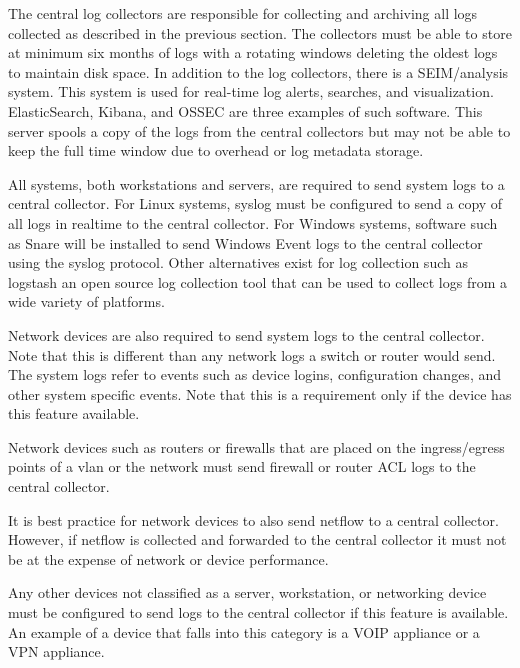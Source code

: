 The central log collectors are responsible for collecting and archiving all logs 
collected as described in the previous section. The collectors must be able to 
store at minimum six months of logs with a rotating windows deleting the oldest 
logs to maintain disk space. In addition to the log collectors, there is a SEIM/analysis 
system. This system is used for real-time log alerts, searches, and 
visualization. ElasticSearch, Kibana, and OSSEC are three examples of such 
software. This server spools a copy of the logs from the central collectors but 
may not be able to keep the full time window due to overhead or log metadata 
storage.

All systems, both workstations and servers, are required to send system logs to 
a central collector. For Linux systems, syslog must be configured to send a copy 
of all logs in realtime to the central collector. For Windows systems, software 
such as Snare will be installed to send Windows Event logs to the central 
collector using the syslog protocol. Other alternatives exist for log collection 
such as logstash an open source log collection tool that can be used to collect 
logs from a wide variety of platforms.

Network devices are also required to send system logs to the central collector. 
Note that this is different than any network logs a switch or router would send. 
The system logs refer to events such as device logins, configuration changes, and 
other system specific events. Note that this is a requirement only if the device 
has this feature available.

Network devices such as routers or firewalls that are placed on the ingress/egress 
points of a vlan or the network must send firewall or router ACL logs to the 
central collector.

It is best practice for network devices to also send netflow to a central 
collector. However, if netflow is collected and forwarded to the central 
collector it must not be at the expense of network or device performance.

Any other devices not classified as a server, workstation, or networking device 
must be configured to send logs to the central collector if this feature is 
available. An example of a device that falls into this category is a VOIP appliance
 or a VPN appliance.